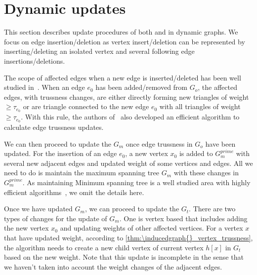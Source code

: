 \section{Dynamic updates}
\label{dynamic}

This section describes update procedures of both \inducedgraph{} and \treeindex{} in dynamic graphs. We focus on edge insertion/deletion as vertex insert/deletion can be represented by inserting/deleting an isolated vertex and several following edge insertions/deletions.

The scope of affected edges when a new edge is inserted/deleted has been well studied in~\cite{huang2014querying}. When an edge $e_0$ has been added/removed from $G_o$, the affected edges, \ie with trussness changes, are either directly forming new triangles of weight $\ge \tau_{e_0}$ or are triangle connected to the new edge $e_0$ with all triangles of weight $\ge \tau_{e_0}$. With this rule, the authors of~\cite{huang2014querying} also developed an efficient algorithm to calculate edge trussness updates. 

We can then proceed to update the \inducedgraph{} $G_m$ once edge trussness in $G_o$ have been updated. For the insertion of an edge $e_0$, a new vertex $x_0$ is added to $G_{m}^{prime}$ with several new adjacent edges and updated weight of some vertices and edges. All we need to do is maintain the maximum spanning tree $G_m$ with these changes in $G_{m}^{prime}$. As maintaining Minimum spanning tree is a well studied area with highly efficient algorithms~\cite{cattaneo2002maintaining}, we omit the details here.

Once we have updated $G_m$, we can proceed to update the \treeindex{} $G_t$. There are two types of changes for the update of $G_m$. One is vertex based that includes adding the new vertex $x_0$ and updating weights of other affected vertices. For a vertex $x$ that have updated weight, according to \autoref{thm:\inducedgraph{}_vertex_trussness}, the algorithm needs to create a new child vertex of current vertex $h[x]$ in $G_t$ based on the new weight. Note that this update is incomplete in the sense that we haven't taken into account the weight changes of the adjacent edges.  

